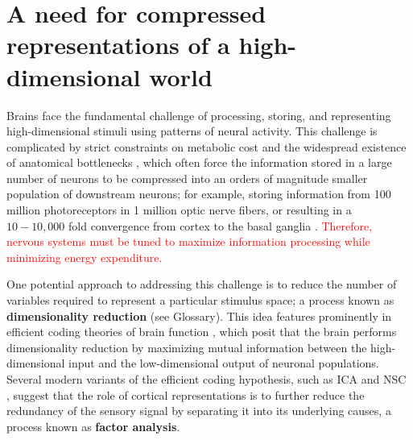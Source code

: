%

\section{A need for compressed representations of a high-dimensional world}
\label{sec:introduction}

Brains face the fundamental challenge of 
processing, storing, and representing high-dimensional stimuli
using patterns of neural activity.
This challenge is complicated by strict constraints on metabolic cost
\citep{Lennie2003}
and the widespread existence of anatomical bottlenecks 
\citep{Kempermann2002,BarGad2003_Review,Babinsky1993,GanguliSompolinsky2012},
which often force the information stored in a large number of neurons
to be compressed into an orders of magnitude smaller population
of downstream neurons;
for example, storing information from 100 million photoreceptors 
in 1 million optic nerve fibers,
or resulting in a $10 - 10,000$ fold convergence from cortex to the basal ganglia
\citep{GanguliSompolinsky2012}. \textcolor{red}{Therefore, nervous systems must be tuned to maximize information processing while minimizing energy expenditure.}

One potential approach to addressing this challenge is to reduce the number
of variables required to represent a particular stimulus space;
a process known as \textbf{dimensionality reduction} (see Glossary).
This idea features prominently in 
efficient coding theories of brain function
\citep{Barlow1961,Barlow2001,Atick1992,Linsker1990},
which posit that the brain performs dimensionality reduction 
by maximizing mutual information between the
high-dimensional input and the low-dimensional output 
of neuronal populations.
Several modern variants of the efficient coding hypothesis,
such as \ac{ICA} \citep{BellSejnowski1997}
and \ac{NSC} \citep{Hoyer2002,Hoyer2004}, suggest that the role of cortical representations is to
further reduce the redundancy of the sensory signal 
by separating it into its underlying causes,
a process known as \textbf{factor analysis}.


